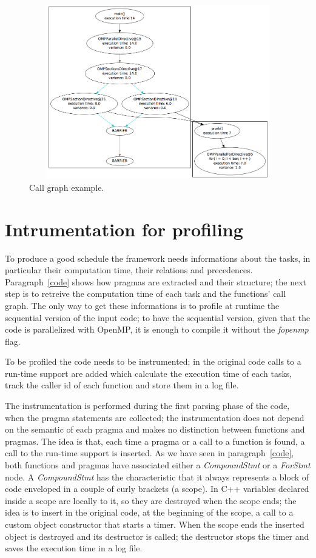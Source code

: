 \documentclass[a4paper,11pt,oneside]{book}
\begin{document}
\begin{figure}[H]
\centering
\includegraphics[width = 130mm, height = 76mm]{call_graph.png}
\caption{Call graph example.}
\label{call_graph}
\end{figure}


\section{Intrumentation for profiling}

To produce a good schedule the framework needs informations about the tasks, in particular their computation time, their relations and precedences. Paragraph~\ref{code} shows how pragmas are extracted and their structure; the next step is to retreive the computation time of each task and the functions’ call graph. The only way to get these informations is to profile at run\-time the sequential version of the input code; to have the sequential version, given that the code is parallelized with OpenMP, it is enough to compile it without the \emph{\-fopenmp} flag. 

To be profiled the code needs to be instrumented; in the original code calls to a run-time support are added which calculate the execution time of each tasks, track the caller id of each function and store them in a log file. 

The instrumentation is performed during the first parsing phase of the code, when the pragma statements are collected; the instrumentation does not depend on the semantic of each pragma and makes no distinction between functions and pragmas. The idea is that, each time a pragma or a call to a function is found, a call to the run-time support is inserted. As we have seen in paragraph~\ref{code}, both functions and pragmas have associated either a \emph{CompoundStmt} or a \emph{ForStmt} node. A \emph{CompoundStmt} has the characteristic that it always represents a block of code enveloped in a couple of curly brackets (a scope). In C++ variables declared inside a scope are locally to it, so they are destroyed when the scope ends; the idea is to insert in the original code, at the beginning of the scope, a call to a custom object constructor that starts a timer. When the scope ends the inserted object is destroyed and its destructor is called; the destructor stops the timer and saves the execution time in a log file. 
\end{document}

